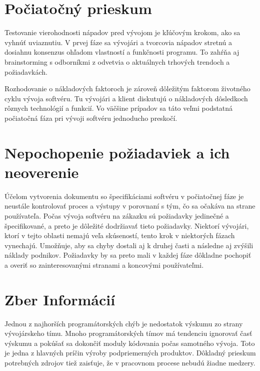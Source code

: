 \documentclass[10pt,twoside,slovak,a4paper]{article}
\begin{document}
\section{Počiatočný prieskum}
Testovanie vierohodnosti nápadov pred vývojom je kľúčovým krokom, ako sa vyhnúť uviaznutiu. V prvej fáze sa vývojári a tvorcovia nápadov stretnú a dosiahnu konsenzus ohľadom vlastností a funkčnosti programu. To zahŕňa aj brainstorming s odborníkmi z odvetvia o aktuálnych trhových trendoch a požiadavkách. 

Rozhodovanie o nákladových faktoroch je zároveň dôležitým faktorom životného cyklu vývoja softvéru. Tu vývojári a klient diskutujú o nákladových dôsledkoch rôznych technológií a funkcií. Vo väčšine prípadov sa táto veľmi podstatná počiatočná fáza pri vývoji softvéru jednoducho preskočí.

\section{Nepochopenie požiadaviek a ich neoverenie}

Účelom vytvorenia dokumentu so špecifikáciami softvéru v počiatočnej fáze je neustále kontrolovať proces a výstupy v porovnaní s tým, čo sa očakáva na strane používateľa. Počas vývoja softvéru na zákazku sú požiadavky jedinečné a špecifikované, a preto je dôležité dodržiavať tieto požiadavky. Niektorí vývojári, ktorí v tejto oblasti nemajú veľa skúseností, tento krok v niektorých fázach vynechajú. Umožňuje, aby sa chyby dostali aj k druhej časti a následne aj zvýšili náklady podnikov. Požiadavky by sa preto mali v každej fáze dôkladne pochopiť a overiť so zainteresovanými stranami a koncovými používateľmi.











\section{Zber Informácií}




Jednou z najhorších programátorských chýb je nedostatok výskumu zo strany vývojárskeho tímu. Mnoho programátorských tímov má tendenciu ignorovať časť výskumu a pokúšať sa dokončiť moduly kódovania počas samotného vývoja. Toto je jedna z hlavných príčin výroby podpriemerných produktov. Dôkladný prieskum potrebných zdrojov tiež zaisťuje, že v pracovnom procese nebudú žiadne medzery.
\end{document}
